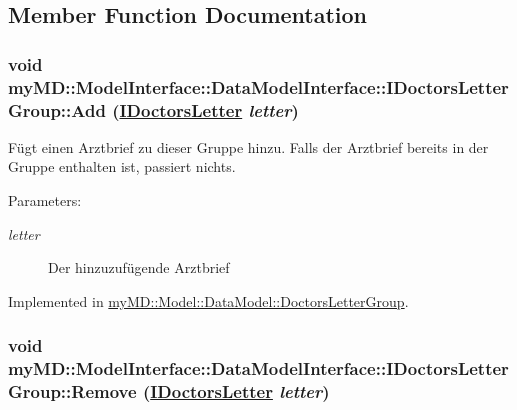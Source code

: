 \subsection{Member Function Documentation}
\hypertarget{interfacemy_m_d_1_1_model_interface_1_1_data_model_interface_1_1_i_doctors_letter_group_369225fad276ca62dd1bd8f6a68ba24f}{
\subsubsection[Add]{\setlength{\rightskip}{0pt plus 5cm}void my\-MD::Model\-Interface::Data\-Model\-Interface::IDoctors\-Letter\-Group::Add (\hyperlink{interfacemy_m_d_1_1_model_interface_1_1_data_model_interface_1_1_i_doctors_letter}{IDoctors\-Letter} {\em letter})}}
\label{d1/df0/interfacemy_m_d_1_1_model_interface_1_1_data_model_interface_1_1_i_doctors_letter_group_369225fad276ca62dd1bd8f6a68ba24f}


F\"{u}gt einen Arztbrief zu dieser Gruppe hinzu. Falls der Arztbrief bereits in der Gruppe enthalten ist, passiert nichts. 

\begin{Desc}
\item[Parameters:]
\begin{description}
\item[{\em letter}]Der hinzuzuf\"{u}gende Arztbrief\end{description}
\end{Desc}


Implemented in \hyperlink{classmy_m_d_1_1_model_1_1_data_model_1_1_doctors_letter_group_369225fad276ca62dd1bd8f6a68ba24f}{my\-MD::Model::Data\-Model::Doctors\-Letter\-Group}.\hypertarget{interfacemy_m_d_1_1_model_interface_1_1_data_model_interface_1_1_i_doctors_letter_group_938bc29cf5917f270a203b621472c238}{
\subsubsection[Remove]{\setlength{\rightskip}{0pt plus 5cm}void my\-MD::Model\-Interface::Data\-Model\-Interface::IDoctors\-Letter\-Group::Remove (\hyperlink{interfacemy_m_d_1_1_model_interface_1_1_data_model_interface_1_1_i_doctors_letter}{IDoctors\-Letter} {\em letter})}}
\label{d1/df0/interfacemy_m_d_1_1_model_interface_1_1_data_model_interface_1_1_i_doctors_letter_group_938bc29cf5917f270a203b621472c238}


